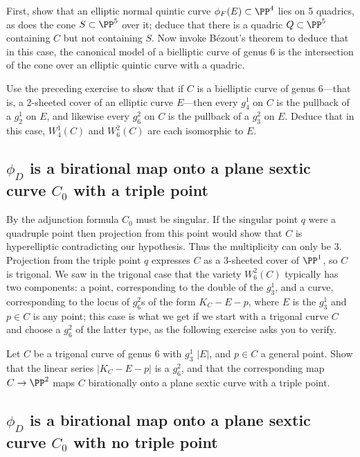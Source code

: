 \begin{exercise}
First, show that an elliptic normal quintic curve $\phi_F(E) \subset \PP^4$ lies on 5 quadrics, as does the cone $S \subset \PP^5$ over it; deduce that there is a quadric $Q \subset \PP^5$ containing $C$ but not containing $S$. Now invoke B\'ezout's theorem to deduce that in this case, the canonical model of a bielliptic curve of genus 6 is the intersection of the cone over an elliptic quintic curve with a quadric.
\end{exercise}


\begin{exercise}
Use the preceding exercise to show that if $C$ is a bielliptic curve of genus 6---that is, a 2-sheeted cover of an elliptic curve $E$---then every $g^1_4$ on $C$ is the pullback of a $g^1_2$ on $E$, and likewise  every $g^2_6$ on $C$ is the pullback of a $g^2_3$ on $E$. Deduce that in this case, $W^1_4(C)$ and $W^2_6(C)$ are each isomorphic to $E$.
\end{exercise}

\subsection{$\phi_{D}$ is a birational map onto a plane sextic curve $C_{0}$ with a triple point}

By the adjunction formula $C_0$ must be singular. If the singular point $q$ were a quadruple point then projection from
this point would show that  $C$ is hyperelliptic contradicting our hypothesis. Thus the multiplicity can
only be 3. 
Projection from the triple point $q$ expresses $C$ as a 3-sheeted cover of $\PP^1$, so $C$ is trigonal. We saw in the trigonal case that the variety $W^2_6(C)$ typically has two components: a point, corresponding to the double of the $g^1_3$, and a curve, corresponding to the locus of $g^2_6$s of the form $K_C - E - p$, where $E$ is the $g^1_3$ and $p \in C$ is any point; this case is what we get if we start with a trigonal curve $C$ and choose a $g^2_6$ of the latter type, as the following exercise asks you to verify.


\begin{exercise}
Let $C$ be a trigonal curve of genus 6 with $g^1_3$ $|E|$, and $p \in C$ a general point. Show that the linear series $|K_C - E-p|$ is a $g^2_6$, and that the corresponding map $C \to \PP^2$ maps $C$ birationally onto a plane sextic curve with a triple point.
\end{exercise}

\subsection{$\phi_{D}$ is a birational map onto a plane sextic curve $C_{0}$ with no triple point}

